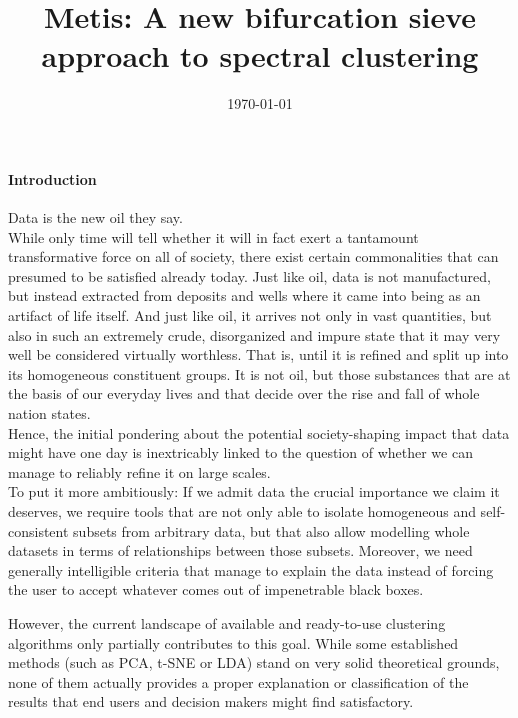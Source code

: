 \documentclass[10pt, a4paper, twocolumn]{article}
\title{Metis: A new bifurcation sieve approach to spectral clustering}
\author{
\authorstyle{Florian Schaefer}
}
\date{\today}
\begin{document}
    \maketitle
    \thispagestyle{firstpage}

    \paragraph{Introduction}
    Data is the new oil they say.
    \\
    While only time will tell whether it will in fact exert a tantamount transformative force on all of society, there exist
    certain commonalities that can presumed to be satisfied already today.
    Just like oil, data is not manufactured, but instead extracted from deposits and wells where it came into being as an
    artifact of life itself.
    And just like oil, it arrives not only in vast quantities, but also in such an extremely crude, disorganized and impure
    state that it may very well be considered virtually worthless.
    That is, until it is refined and split up into its homogeneous constituent groups.
    It is not oil, but those substances that are at the basis of our everyday lives and that decide over the rise and fall
    of whole nation states.
    \\
    Hence, the initial pondering about the potential society-shaping impact that data might have one day is inextricably
    linked to the question of whether we can manage to reliably refine it on large scales.
    \\
    To put it more ambitiously: If we admit data the crucial importance we claim it deserves, we require tools that are
    not only able to isolate homogeneous and self-consistent subsets from arbitrary data, but that also allow modelling
    whole datasets in terms of relationships between those subsets.
    Moreover, we need generally intelligible criteria that manage to explain the data instead of forcing the user to
    accept whatever comes out of impenetrable black boxes.

    However, the current landscape of available and ready-to-use clustering algorithms only partially contributes to this goal.
    While some established methods (such as PCA, t-SNE or LDA) stand on very solid theoretical grounds, none of them
    actually provides a proper explanation or classification of the results that end users and decision makers might
    find satisfactory.
\end{document}
